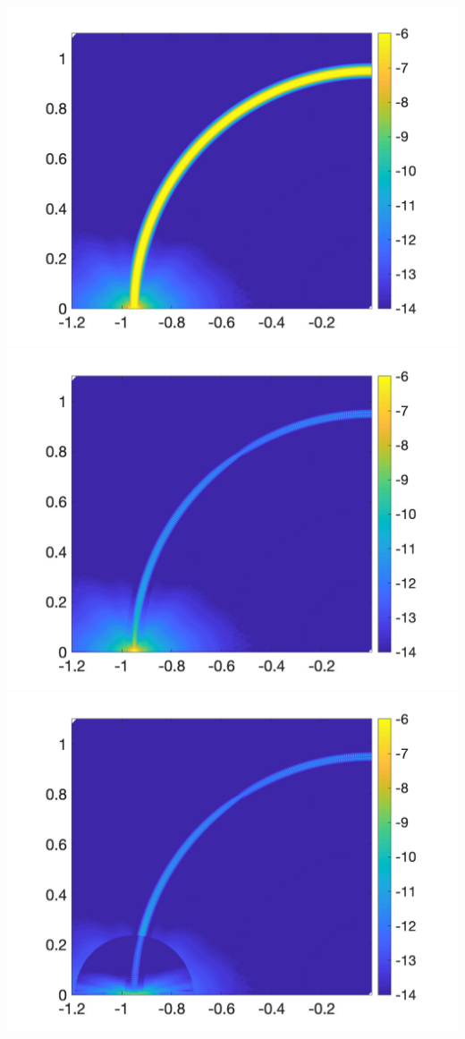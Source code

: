 \includegraphics[trim=40 20 40 10, clip, width=2.5truein]{figs/fig400a4} 
\includegraphics[trim=40 20 40 10, clip, width=2.5truein]{figs/fig400b4} 
\includegraphics[trim=40 20 40 10, clip, width=2.5truein]{figs/fig400c4}\\
